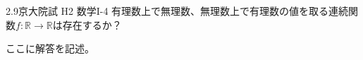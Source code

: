 \begin{prob}{2.9}{}{京大院試 H2 数学I-4}
有理数上で無理数、無理数上で有理数の値を取る連続関数$f:\mathbb{R}\to\mathbb{R}$は存在するか？
\end{prob}

ここに解答を記述。
